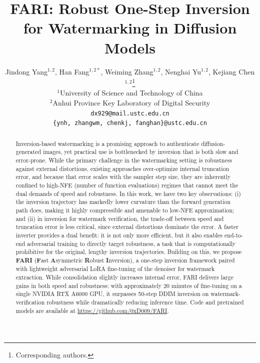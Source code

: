 \documentclass{article}
\title{FARI: Robust One-Step Inversion for Watermarking in Diffusion Models}
\author{
  Jindong Yang$^{1,2}$, Han Fang$^{1,2*}$, Weiming Zhang$^{1,2}$, Nenghai Yu$^{1,2}$, Kejiang Chen$^{1,2}$\thanks{Corresponding authors.}\\
  $^1$University of Science and Technology of China \\
  $^2$Anhui Province Key Laboratory of Digital Security\\
  \texttt{dx929@mail.ustc.edu.cn} \\
  \texttt{\{ynh, zhangwm, chenkj, fanghan\}@ustc.edu.cn}
}
\begin{document}
\maketitle

\begin{abstract}
Inversion-based watermarking is a promising approach to authenticate diffusion-generated images, yet practical use is bottlenecked by inversion that is both slow and error-prone. While the primary challenge in the watermarking setting is robustness against external distortions, existing approaches over-optimize internal truncation error, and because that error scales with the sampler step size, they are inherently confined to high-NFE (number of function evaluations) regimes that cannot meet the dual demands of speed and robustness. In this work, we have two key observations: (i) the inversion trajectory has markedly lower curvature than the forward generation path does, making it highly compressible and amenable to low-NFE approximation; and (ii) in inversion for watermark verification, the trade-off between speed and truncation error is less critical, since external distortions dominate the error. A faster inverter provides a dual benefit: it is not only more efficient, but it also enables end-to-end adversarial training to directly target robustness, a task that is computationally prohibitive for the original, lengthy inversion trajectories. Building on this, we propose \textbf{FARI} (\textbf{F}ast \textbf{A}symmetric \textbf{R}obust \textbf{I}nversion), a one-step inversion framework paired with lightweight adversarial LoRA fine-tuning of the denoiser for watermark extraction. While consolidation slightly increases internal error, FARI delivers large gains in both speed and robustness: with approximately 20 minutes of fine-tuning on a single NVIDIA RTX A6000 GPU, it surpasses 50-step DDIM inversion on watermark-verification robustness while dramatically reducing inference time. Code and pretrained models are available at \url{https://github.com/0xD009/FARI}.


\end{abstract}
\end{document}
